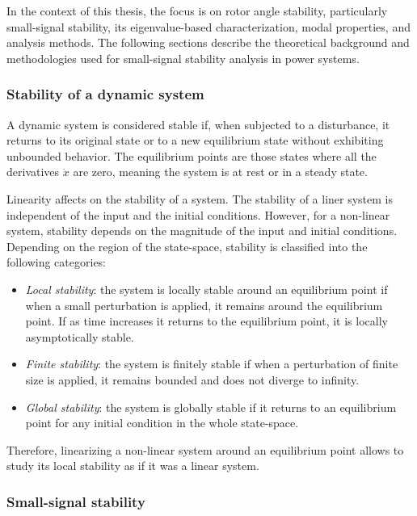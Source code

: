 In the context of this thesis, the focus is on rotor angle stability, particularly small-signal stability, its eigenvalue-based characterization, 
modal properties, and analysis methods. The following sections describe the theoretical background and methodologies used for small-signal stability 
analysis in power systems. 

\subsubsection{Stability of a dynamic system}

A dynamic system is considered stable if, when subjected to a disturbance, it returns to its original state or to a new equilibrium state without
exhibiting unbounded behavior. The equilibrium points are those states where all the derivatives $\dot{x}$ are zero, meaning the system is at rest
or in a steady state. 

Linearity affects on the stability of a system. The stability of a liner system is independent of the input and the initial conditions.
However, for a non-linear system, stability depends on the magnitude of the input and initial conditions. Depending on the region of the state-space,
stability is classified into the following categories:

\begin{itemize}
  \item \textit{Local stability}: the system is locally stable around an equilibrium point if when a small perturbation is applied,
  it remains around the equilibrium point. If as time increases it returns to the equilibrium point, it is locally asymptotically stable\cite{StabilityAndControlKundur}.
  \item \textit{Finite stability}: the system is finitely stable if when a perturbation of finite size is applied, it remains bounded and does not diverge to infinity.
  \item \textit{Global stability}: the system is globally stable if it returns to an equilibrium point for any initial condition in the whole state-space.
\end{itemize}

Therefore, linearizing a non-linear system around an equilibrium point allows to study its local stability as if it was a linear system. 

\subsubsection{Small-signal stability}

